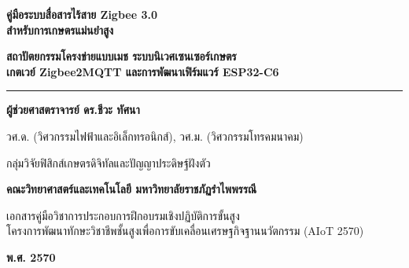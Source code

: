 \thispagestyle{empty}
\begin{center}
    \vspace*{1.5cm}
    
    {\fontsize{24}{30}\selectfont\bfseries\color{rbruNavy} คู่มือระบบสื่อสารไร้สาย Zigbee 3.0\\สำหรับการเกษตรแม่นยำสูง\par}
    
    \vspace{0.8cm}
    {\fontsize{14}{20}\selectfont\bfseries\color{agriForest} สถาปัตยกรรมโครงข่ายแบบเมช ระบบนิเวศเซนเซอร์เกษตร\\เกตเวย์ Zigbee2MQTT และการพัฒนาเฟิร์มแวร์ ESP32-C6\par}
    
    \vspace{1.2cm}
    {\color{rbruGold}\rule{0.6\textwidth}{1.5pt}\par}
    
    \vspace{1.5cm}
    {\fontsize{16}{22}\selectfont\bfseries\color{charcoal} ผู้ช่วยศาสตราจารย์ ดร.ชีวะ ทัศนา\par}
    \vspace{0.3cm}
    {\fontsize{12}{16}\selectfont\color{slateGrey} วศ.ด. (วิศวกรรมไฟฟ้าและอิเล็กทรอนิกส์), วศ.ม. (วิศวกรรมโทรคมนาคม)\par}
    {\fontsize{12}{16}\selectfont\color{slateGrey} กลุ่มวิจัยฟิสิกส์เกษตรดิจิทัลและปัญญาประดิษฐ์ฝังตัว\par}
    
    \vfill
    
    {\fontsize{13}{18}\selectfont\bfseries\color{rbruNavy} คณะวิทยาศาสตร์และเทคโนโลยี มหาวิทยาลัยราชภัฏรำไพพรรณี\par}
    \vspace{0.2cm}
    {\fontsize{11}{15}\selectfont\color{slateGrey} เอกสารคู่มือวิชาการประกอบการฝึกอบรมเชิงปฏิบัติการขั้นสูง\\โครงการพัฒนาทักษะวิชาชีพชั้นสูงเพื่อการขับเคลื่อนเศรษฐกิจฐานนวัตกรรม (AIoT 2570)\par}
    \vspace{0.4cm}
    {\fontsize{11}{15}\selectfont\bfseries\color{rbruGold} พ.ศ. 2570\par}
\end{center}
\clearpage
